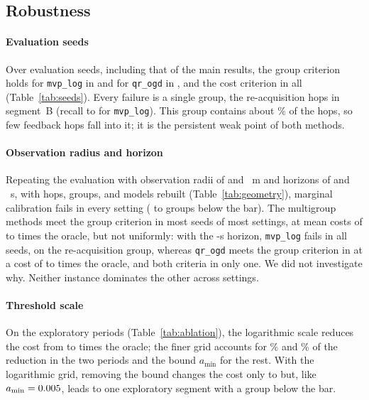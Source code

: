 \subsection{Robustness}
\label{app:earlier:robust}
\label{app:earlier:seeds}
\label{app:earlier:custody}
\label{app:earlier:ablation}
\label{app:earlier:sensitivity}

\paragraph*{Evaluation seeds}
Over \seedCount{} evaluation seeds, including that of the main results, the group
criterion holds for \texttt{mvp\_log} in \seedCOnePassMvpLog{} and for
\texttt{qr\_ogd} in \seedCOnePassQrOgd{}, and the cost criterion in all
(Table~\ref{tab:seeds}). Every failure is a single group, the re-acquisition hops
in segment~B (recall \seedReacqMvpLogMin{} to \seedReacqMvpLogMax{} for
\texttt{mvp\_log}). This group contains about \reacqSharePct\% of the hops, so few
feedback hops fall into it; it is the persistent weak point of both methods.

\paragraph*{Observation radius and horizon}
Repeating the evaluation with observation radii of \geomRadiusSmall{} and
\geomRadiusLarge~m and horizons of \geomTmaxShort{} and \geomTmaxLong~s, with
hops, groups, and models rebuilt (Table~\ref{tab:geometry}), marginal calibration
fails in every setting (\geomMarginalBelowMin{} to \geomMarginalBelowMax{} groups
below the bar). The multigroup methods meet the group criterion in most seeds of
most settings, at mean costs of \geomMultiCostSeedMeanMin{} to
\geomMultiCostSeedMeanMax{} times the oracle, but not uniformly: with the
\geomTmaxLong-s horizon, \texttt{mvp\_log} fails in all \geomSeedCountWord{} seeds,
on the re-acquisition group, whereas \texttt{qr\_ogd} meets the group criterion in
\geomTmaxLongQrOgdPassWord{} at a cost of \geomTmaxLongQrOgdCostMin{} to
\geomTmaxLongQrOgdCostMax{} times the oracle, and both criteria in only one. We did
not investigate why. Neither instance dominates the other across settings.

\paragraph*{Threshold scale}
On the exploratory periods (Table~\ref{tab:ablation}), the logarithmic scale
reduces the cost from \ablUnifNoCapRatioMean{} to \ablLogCapRatioMean{} times the
oracle; the finer grid accounts for \ablResolutionSharePctFirst\% and
\ablResolutionSharePctSecond\% of the reduction in the two periods and the bound
$a_{\min}$ for the rest. With the logarithmic grid, removing the bound changes the
cost only to \ablLogNoCapMatchedRatioMean{} but, like $a_{\min}=0.005$, leads to
one exploratory segment with a group below the bar.

